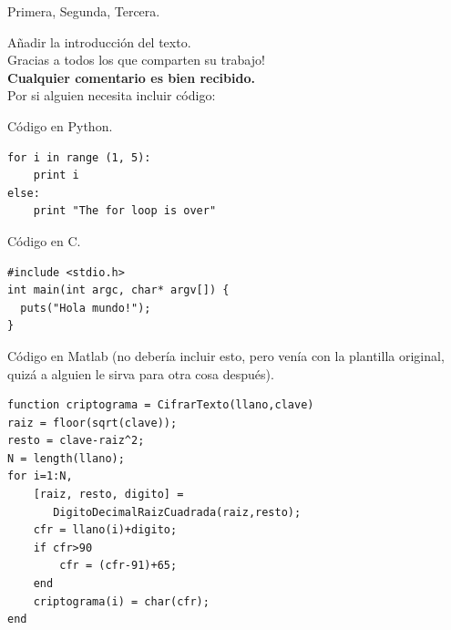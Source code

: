 \vspace{2mm}

\begin{multicols}{2}



 Primera, Segunda, Tercera.



Añadir la introducción del texto. \\
Gracias a todos los que comparten su trabajo!\\
\textbf{Cualquier comentario es bien recibido.}\\
Por si alguien necesita incluir código:


Código en Python.
\begin{verbatim}
for i in range (1, 5):
    print i
else:
    print "The for loop is over"
\end{verbatim}

Código en  C.

\begin{lstlisting}
#include <stdio.h>
int main(int argc, char* argv[]) {
  puts("Hola mundo!");
}
\end{lstlisting}

\vspace{2mm}
 
Código en Matlab (no debería incluir esto, pero venía con la plantilla original, quizá a alguien le sirva para otra cosa después).\\
\lstset{language=Matlab,frame=tb,framesep=5pt,basicstyle=\scriptsize}   
\begin{lstlisting}
function criptograma = CifrarTexto(llano,clave)
raiz = floor(sqrt(clave));
resto = clave-raiz^2;
N = length(llano);
for i=1:N,
    [raiz, resto, digito] = 
       DigitoDecimalRaizCuadrada(raiz,resto);
    cfr = llano(i)+digito;
    if cfr>90
        cfr = (cfr-91)+65;
    end
    criptograma(i) = char(cfr);
end
\end{lstlisting} 
 

\end{multicols}
